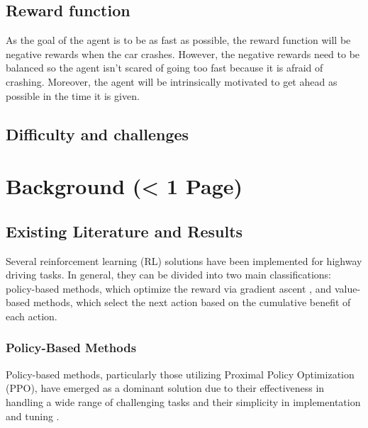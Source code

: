 \documentclass{article}
\begin{document}
\subsection{Reward function}
As the goal of the agent is to be as fast as possible, the reward function will be negative rewards when the car crashes. However, the negative rewards need to be balanced so the agent isn't scared of going too fast because it is afraid of crashing. Moreover, the agent will be intrinsically motivated to get ahead as possible in the time it is given.

\subsection{Difficulty and challenges}


\section{Background (< 1 Page)}

\subsection{Existing Literature and Results}
Several reinforcement learning (RL) solutions have been implemented for highway driving tasks. In general, they can be divided into two main classifications: policy-based methods, which optimize the reward via gradient ascent \citep{sutton_policy_1999}, and value-based methods, which select the next action based on the cumulative benefit of each action. %

\subsubsection{Policy-Based Methods}
\label{sec: related-work}
Policy-based methods, particularly those utilizing Proximal Policy Optimization (PPO), have emerged as a dominant solution due to their effectiveness in handling a wide range of challenging tasks and their simplicity in implementation and tuning \citep{schulman_proximal_2017}. 
\end{document}
